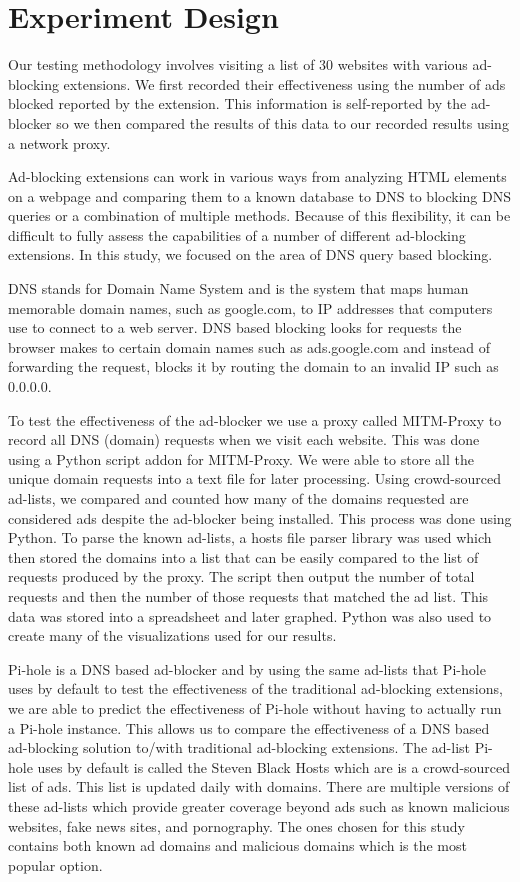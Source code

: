 \documentclass[sigsmall]{acmart}
\begin{document}
\section*{Experiment Design}
Our testing methodology involves visiting a list of 30 websites with various ad-blocking extensions. We first recorded their effectiveness using the number of ads blocked reported by the extension. This information is self-reported by the ad-blocker so we then compared the results of this data to our recorded results using a network proxy.

Ad-blocking extensions can work in various ways from analyzing HTML elements on a webpage and comparing them to a known database to DNS to blocking DNS queries or a combination of multiple methods. Because of this flexibility, it can be difficult to fully assess the capabilities of a number of different ad-blocking extensions. In this study, we focused on the area of DNS query based blocking.

DNS stands for Domain Name System and is the system that maps human memorable domain names, such as google.com, to IP addresses that computers use to connect to a web server. DNS based blocking looks for requests the browser makes to certain domain names such as ads.google.com and instead of forwarding the request, blocks it by routing the domain to an invalid IP such as 0.0.0.0.

To test the effectiveness of the ad-blocker we use a proxy called MITM-Proxy to record all DNS (domain) requests when we visit each website. This was done using a Python script addon for MITM-Proxy. We were able to store all the unique domain requests into a text file for later processing. Using crowd-sourced ad-lists, we compared and counted how many of the domains requested are considered ads despite the ad-blocker being installed. This process was done using Python. To parse the known ad-lists, a hosts file parser library was used which then stored the domains into a list that can be easily compared to the list of requests produced by the proxy. The script then output the number of total requests and then the number of those requests that matched the ad list. This data was stored into a spreadsheet and later graphed. Python was also used to create many of the visualizations used for our results.

Pi-hole is a DNS based ad-blocker and by using the same ad-lists that Pi-hole uses by default to test the effectiveness of the traditional ad-blocking extensions, we are able to predict the effectiveness of Pi-hole without having to actually run a Pi-hole instance. This allows us to compare the effectiveness of a DNS based ad-blocking solution to/with traditional ad-blocking extensions. The ad-list Pi-hole uses by default is called the Steven Black Hosts which are is a crowd-sourced list of ads. This list is updated daily with domains. There are multiple versions of these ad-lists which provide greater coverage beyond ads such as known malicious websites, fake news sites, and pornography. The ones chosen for this study contains both known ad domains and malicious domains which is the most popular option.
\end{document}
